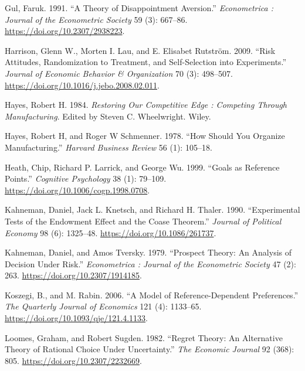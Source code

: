 \documentclass[
  12,
  letterpaper,
  DIV=11,
  numbers=noendperiod]{scrartcl}
\newlength{\cslhangindent}
\newenvironment{CSLReferences}[2] %
 {\begin{list}{}{%
  \setlength{\itemindent}{0pt}
  \setlength{\leftmargin}{0pt}
  \setlength{\parsep}{0pt}
  \ifodd #1
   \setlength{\leftmargin}{\cslhangindent}
   \setlength{\itemindent}{-1\cslhangindent}
  \fi
  \setlength{\itemsep}{#2\baselineskip}}}
 {\end{list}}
\begin{document}
\begin{CSLReferences}{1}{1}
Gul, Faruk. 1991. {``A {Theory} of {Disappointment Aversion}.''}
\emph{Econometrica : Journal of the Econometric Society} 59 (3):
667--86. \url{https://doi.org/10.2307/2938223}.

Harrison, Glenn W., Morten I. Lau, and E. Elisabet Rutström. 2009.
{``Risk Attitudes, Randomization to Treatment, and Self-Selection into
Experiments.''} \emph{Journal of Economic Behavior \& Organization} 70
(3): 498--507. \url{https://doi.org/10.1016/j.jebo.2008.02.011}.

Hayes, Robert H. 1984. \emph{Restoring Our Competitive Edge :
{Competing} Through Manufacturing}. Edited by Steven C. Wheelwright.
Wiley.

Hayes, Robert H, and Roger W Schmenner. 1978. {``How Should You Organize
Manufacturing.''} \emph{Harvard Business Review} 56 (1): 105--18.

Heath, Chip, Richard P. Larrick, and George Wu. 1999. {``Goals as
{Reference Points}.''} \emph{Cognitive Psychology} 38 (1): 79--109.
\url{https://doi.org/10.1006/cogp.1998.0708}.

Kahneman, Daniel, Jack L. Knetsch, and Richard H. Thaler. 1990.
{``Experimental {Tests} of the {Endowment Effect} and the {Coase
Theorem}.''} \emph{Journal of Political Economy} 98 (6): 1325--48.
\url{https://doi.org/10.1086/261737}.

Kahneman, Daniel, and Amos Tversky. 1979. {``Prospect {Theory}: {An
Analysis} of {Decision} Under {Risk}.''} \emph{Econometrica : Journal of
the Econometric Society} 47 (2): 263.
\url{https://doi.org/10.2307/1914185}.

Koszegi, B., and M. Rabin. 2006. {``A {Model} of {Reference-Dependent
Preferences}.''} \emph{The Quarterly Journal of Economics} 121 (4):
1133--65. \url{https://doi.org/10.1093/qje/121.4.1133}.

Loomes, Graham, and Robert Sugden. 1982. {``Regret {Theory}: {An
Alternative Theory} of {Rational Choice Under Uncertainty}.''} \emph{The
Economic Journal} 92 (368): 805. \url{https://doi.org/10.2307/2232669}.


\end{CSLReferences}
\end{document}
